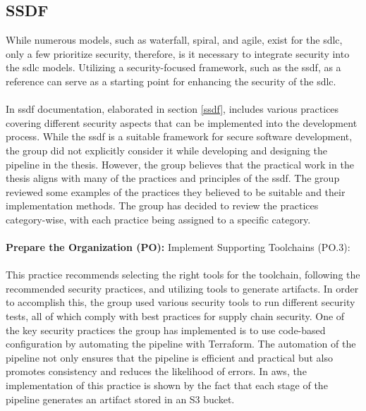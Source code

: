 \subsection{SSDF}
While numerous models, such as waterfall, spiral, and agile, exist for the \acrlong{sdlc}, only a few prioritize security, therefore, is it necessary to integrate security into the \acrshort{sdlc} models. Utilizing a security-focused framework, such as the \acrshort{ssdf}, as a reference can serve as a starting point for enhancing the security of the \acrshort{sdlc}. 
\\~\\
In \acrshort{ssdf} documentation, elaborated in section \ref{ssdf}, includes various practices covering different security aspects that can be implemented into the development process. While the \acrshort{ssdf} is a suitable framework for secure software development, the group did not explicitly consider it while developing and designing the \gls{pipeline} in the thesis. However, the group believes that the practical work in the thesis aligns with many of the practices and principles of the \acrshort{ssdf}. The group reviewed some examples of the practices they believed to be suitable and their implementation methods. The group has decided to review the practices category-wise, with each practice being assigned to a specific category. 
\\~\\
\textbf{Prepare the Organization (PO):}
Implement Supporting Toolchains (PO.3): \textit{}\cite{ssdf}
\\~\\
This practice recommends selecting the right tools for the toolchain, following the recommended security practices, and utilizing tools to generate artifacts. In order to accomplish this, the group used various security tools to run different security tests, all of which comply with best practices for supply chain security. One of the key security practices the group has implemented is to use code-based configuration by automating the \gls{pipeline} with Terraform. The automation of the \gls{pipeline} not only ensures that the pipeline is efficient and practical but also promotes consistency and reduces the likelihood of errors. In \acrshort{aws}, the implementation of this practice is shown by the fact that each stage of the \gls{pipeline} generates an artifact stored in an S3 bucket. 
